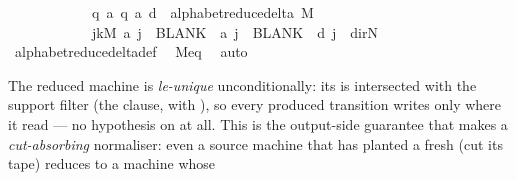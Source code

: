 \begin{isabellebody}
\ \ \ \ \ \ \ \ \ \ \ \ {\isacharparenleft}{\kern0pt}q{\isacharcomma}{\kern0pt}\ a{\isacharcomma}{\kern0pt}\ q{\isacharprime}{\kern0pt}{\isacharcomma}{\kern0pt}\ a{\isacharprime}{\kern0pt}{\isacharcomma}{\kern0pt}\ d{\isacharparenright}{\kern0pt}\ {\isasymin}\ alphabet{\isacharunderscore}{\kern0pt}reduce{\isacharunderscore}{\kern0pt}delta\ M\ {\isasymlongrightarrow}\isanewline
\ \ \ \ \ \ \ \ \ \ \ \ {\isacharparenleft}{\kern0pt}{\isasymforall}j{\isasymge}k\isactrlsub M{\isachardot}{\kern0pt}\ a\ j\ {\isacharequal}{\kern0pt}\ BLANK{}\ {\isasymand}\ a{\isacharprime}{\kern0pt}\ j\ {\isacharequal}{\kern0pt}\ BLANK{}\ {\isasymand}\ d\ j\ {\isacharequal}{\kern0pt}\ dir{\isachardot}{\kern0pt}N{\isacharparenright}{\kern0pt}{\isachardoublequoteclose}\isanewline
\ \ \ \ \ \ \isamarkupfalse%
\ alphabet{\isacharunderscore}{\kern0pt}reduce{\isacharunderscore}{\kern0pt}delta{\isacharunderscore}{\kern0pt}def\ \isamarkupfalse%
\ M{\isacharunderscore}{\kern0pt}eq\ \isamarkupfalse%
\ auto\isanewline
\ \ \isamarkupfalse%
\isanewline
{}\isamarkupfalse%
%
\endisatagproof
{\isafoldproof}%
%
\isadelimproof
%
\endisadelimproof
%
\begin{isamarkuptext}%
The reduced machine is \emph{le-unique} unconditionally: its
  \isa{{\isasymdelta}{\isacharprime}{\kern0pt}} is intersected with the support filter
  (the  clause, with ), so every produced transition writes  only where it
  read  — no hypothesis on  at all.  This is the
  output-side guarantee that makes  a
  \emph{cut-absorbing} normaliser: even a source machine that has
  planted a fresh  (cut its tape) reduces to a machine whose

\end{isamarkuptext}
\end{isabellebody}
